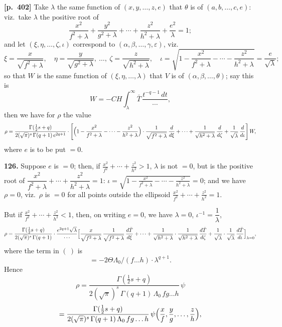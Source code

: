 \documentclass[11pt,a4paper]{article}
\begin{document}
\noindent\textbf{[p.~402]}\quad
Take $\lambda$ the same function of $(x, y, \ldots, z, e)$ that $\theta$ is of $(a, b, \ldots, c, e)$: viz.\ take $\lambda$ the positive root of
\[
\frac{x^{2}}{f^{2}+\lambda} + \frac{y^{2}}{g^{2}+\lambda} + \cdots + \frac{z^{2}}{h^{2}+\lambda} + \frac{e^{2}}{\lambda} = 1;
\]
and let $(\xi, \eta, \ldots, \zeta, \iota)$ correspond to $(\alpha, \beta, \ldots, \gamma, \varepsilon)$, viz.
\[
\xi = \frac{x}{\sqrt{f^{2}+\lambda}},\quad \eta = \frac{y}{\sqrt{g^{2}+\lambda}},\ \ldots,\ \zeta = \frac{z}{\sqrt{h^{2}+\lambda}},\quad \iota = \sqrt{1 - \frac{x^{2}}{f^{2}+\lambda} - \cdots - \frac{z^{2}}{h^{2}+\lambda}} = \frac{e}{\sqrt{\lambda}};
\]
so that $W$ is the same function of $(\xi, \eta, \ldots, \lambda)$ that $V$ is of $(\alpha, \beta, \ldots, \theta)$; say this is
\[
W = -C H\int_{\lambda}^{\infty} \bar{T}\,\frac{t^{-q-1}\,dt}{\cdots},
\]
then we have for $\rho$ the value
\[
\rho = \frac{\Gamma(\tfrac{1}{2}s + q)}{2(\sqrt{\pi})^{s}\,\Gamma(q+1)\,e^{2q+1}}\cdot\left[\Bigl(1 - \frac{x^{2}}{f^{2}+\lambda} - \cdots - \frac{z^{2}}{h^{2}+\lambda}\Bigr)\cdot\frac{1}{\sqrt{f^{2}+\lambda}}\,\frac{d}{d\xi} + \cdots + \frac{1}{\sqrt{h^{2}+\lambda}}\,\frac{d}{d\zeta} + \frac{1}{\sqrt{\lambda}}\,\frac{d}{d\iota}\right] W,
\]
where $e$ is to be put $= 0$.

\textbf{126.} Suppose $e$ is $= 0$; then, if $\tfrac{x^{2}}{f^{2}} + \cdots + \tfrac{z^{2}}{h^{2}} > 1$, $\lambda$ is not $= 0$, but is the positive root of $\dfrac{x^{2}}{f^{2}+\lambda} + \cdots + \dfrac{z^{2}}{h^{2}+\lambda} = 1$: $\iota = \sqrt{1 - \tfrac{x^{2}}{f^{2}+\lambda} - \cdots - \tfrac{z^{2}}{h^{2}+\lambda}} = 0$;
and we have $\rho = 0$, viz.\ $\rho$ is $= 0$ for all points outside the ellipsoid $\tfrac{x^{2}}{f^{2}} + \cdots + \tfrac{z^{2}}{h^{2}} = 1$.

But if $\tfrac{x^{2}}{f^{2}} + \cdots + \tfrac{z^{2}}{h^{2}} < 1$, then, on writing $e = 0$, we have $\lambda = 0$, $\iota^{-1} = \dfrac{1}{\lambda}$,
\[
\rho = \frac{\Gamma(\tfrac{1}{2}s + q)}{2(\sqrt{\pi})^{s}\,\Gamma(q+1)}\cdot\frac{e^{2q+1}\sqrt{\lambda}}{\cdots}\Bigl[\frac{x}{\sqrt{f^{2}+\lambda}}\,\frac{1}{\sqrt{f^{2}+\lambda}}\,\frac{d\bar{T}}{d\xi} + \cdots + \frac{1}{\sqrt{h^{2}+\lambda}}\cdot\frac{1}{\sqrt{h^{2}+\lambda}}\,\frac{d\bar{T}}{d\zeta} + \frac{1}{\sqrt{\lambda}}\cdot\frac{1}{\sqrt{\lambda}}\,\frac{d\bar{T}}{d\iota}\Bigr]_{\lambda = 0},
\]
where the term in $(\ )$ is
\[
= -2\Theta\Lambda_{0}/(f\ldots h)\cdot\lambda^{q+1}.
\]
Hence
\[
\rho = \frac{\Gamma(\tfrac{1}{2}s + q)}{2(\sqrt{\pi})^{s}\,\Gamma(q+1)\,\Lambda_{0}\,fg\ldots h}\,\psi
\]
\[
= \frac{\Gamma(\tfrac{1}{2}s + q)}{2(\sqrt{\pi})^{s}\,\Gamma(q+1)\,\Lambda_{0}\,fg\ldots h}\,\psi\Bigl(\frac{x}{f},\frac{y}{g},\ldots,\frac{z}{h}\Bigr),
\]
\end{document}

